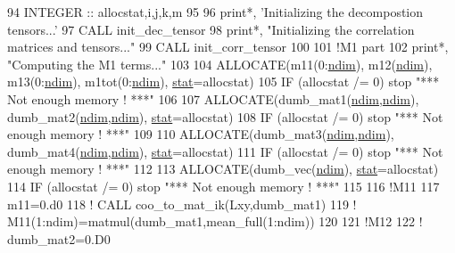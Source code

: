 \begin{DoxyCode}
94     \textcolor{keywordtype}{INTEGER} :: allocstat,i,j,k,m
95     
96     print*, \textcolor{stringliteral}{'Initializing the decompostion tensors...'}
97     \textcolor{keyword}{CALL }init\_dec\_tensor
98     print*, \textcolor{stringliteral}{"Initializing the correlation matrices and tensors..."}
99     \textcolor{keyword}{CALL }init\_corr\_tensor
100     
101     \textcolor{comment}{!M1 part}
102     print*, \textcolor{stringliteral}{"Computing the M1 terms..."}
103 
104     \textcolor{keyword}{ALLOCATE}(m11(0:\hyperlink{namespaceparams_a2323fe1773f086e20c14f266351c482b}{ndim}), m12(\hyperlink{namespaceparams_a2323fe1773f086e20c14f266351c482b}{ndim}), m13(0:\hyperlink{namespaceparams_a2323fe1773f086e20c14f266351c482b}{ndim}), m1tot(0:\hyperlink{namespaceparams_a2323fe1773f086e20c14f266351c482b}{ndim}), 
      \hyperlink{namespacestat}{stat}=allocstat)
105     \textcolor{keywordflow}{IF} (allocstat /= 0) stop \textcolor{stringliteral}{"*** Not enough memory ! ***"}
106 
107     \textcolor{keyword}{ALLOCATE}(dumb\_mat1(\hyperlink{namespaceparams_a2323fe1773f086e20c14f266351c482b}{ndim},\hyperlink{namespaceparams_a2323fe1773f086e20c14f266351c482b}{ndim}), dumb\_mat2(\hyperlink{namespaceparams_a2323fe1773f086e20c14f266351c482b}{ndim},\hyperlink{namespaceparams_a2323fe1773f086e20c14f266351c482b}{ndim}), \hyperlink{namespacestat}{stat}=allocstat)
108     \textcolor{keywordflow}{IF} (allocstat /= 0) stop \textcolor{stringliteral}{"*** Not enough memory ! ***"}
109 
110     \textcolor{keyword}{ALLOCATE}(dumb\_mat3(\hyperlink{namespaceparams_a2323fe1773f086e20c14f266351c482b}{ndim},\hyperlink{namespaceparams_a2323fe1773f086e20c14f266351c482b}{ndim}), dumb\_mat4(\hyperlink{namespaceparams_a2323fe1773f086e20c14f266351c482b}{ndim},\hyperlink{namespaceparams_a2323fe1773f086e20c14f266351c482b}{ndim}), \hyperlink{namespacestat}{stat}=allocstat)
111     \textcolor{keywordflow}{IF} (allocstat /= 0) stop \textcolor{stringliteral}{"*** Not enough memory ! ***"}
112 
113     \textcolor{keyword}{ALLOCATE}(dumb\_vec(\hyperlink{namespaceparams_a2323fe1773f086e20c14f266351c482b}{ndim}), \hyperlink{namespacestat}{stat}=allocstat)
114     \textcolor{keywordflow}{IF} (allocstat /= 0) stop \textcolor{stringliteral}{"*** Not enough memory ! ***"}
115 
116     \textcolor{comment}{!M11}
117     m11=0.d0
118     \textcolor{comment}{! CALL coo\_to\_mat\_ik(Lxy,dumb\_mat1)}
119     \textcolor{comment}{! M11(1:ndim)=matmul(dumb\_mat1,mean\_full(1:ndim))}
120 
121     \textcolor{comment}{!M12}
122     \textcolor{comment}{! dumb\_mat2=0.D0}

\end{DoxyCode}
